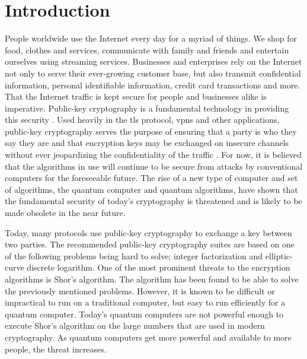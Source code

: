 \chapter{Introduction}
\label{chapter:introduction}




People worldwide use the Internet every day for a myriad of things. We shop for food, clothes and services, communicate with family and friends and entertain ourselves using streaming services. Businesses and enterprises rely on the Internet not only to serve their ever-growing customer base, but also transmit confidential information, personal identifiable information, credit card transactions and more. That the Internet traffic is kept secure for people and businesses alike is imperative. Public-key cryptography is a fundamental technology in providing this security \cite{rfc8446}. Used heavily in the \gls{tls} protocol, \glspl{vpn} and other applications, public-key cryptography serves the purpose of ensuring that a party is who they say they are and that encryption keys may be exchanged on insecure channels without ever jeopardizing the confidentiality of the traffic \cite{rfc8446}. For now, it is believed that the algorithms in use will continue to be secure from attacks by conventional computers for the foreseeable future. The rise of a new type of computer and set of algorithms, the quantum computer and quantum algorithms, have shown that the fundamental security of today's cryptography is threatened and is likely to be made obsolete in the near future.

Today, many protocols use public-key cryptography to exchange a key between two parties. The recommended public-key cryptography suites are based on one of the following problems being hard to solve; integer factorization and elliptic-curve discrete logarithm\cite{nsa2015, nist2019}. One of the most prominent threats to the encryption algorithms is Shor's algorithm\cite{shor1997}. The algorithm has been found to be able to solve the previously mentioned problems. However, it is known to be difficult or impractical to run on a traditional computer, but easy to run efficiently for a quantum computer. Today's quantum computers are not powerful enough to execute Shor's algorithm on the large numbers that are used in modern cryptography. As quantum computers get more powerful and available to more people, the threat increases.

